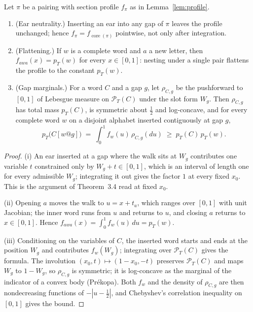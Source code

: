\begin{lemma}\label{lem:calculus}
Let $\pi$ be a pairing with section profile $f_\pi$ as in
Lemma~\ref{lem:profile}.
\begin{enumerate}
\item[(i)] (Ear neutrality.)  Inserting an ear into any gap of $\pi$
leaves the profile unchanged; hence $f_\pi=f_{\operatorname{core}(\pi)}$
pointwise, not only after integration.
\item[(ii)] (Flattening.)  If $w$ is a complete word and $a$ a new letter,
then $f_{awa}(x)=p_T(w)$ for every $x\in[0,1]$: nesting under a single
pair flattens the profile to the constant $p_T(w)$.
\item[(iii)] (Gap marginals.)  For a word $C$ and a gap $g$, let
$\rho_{C,g}$ be the pushforward to $[0,1]$ of Lebesgue measure on
$\mathcal P_T(C)$ under the slot form $W_g$.  Then $\rho_{C,g}$ has total
mass $p_T(C)$, is symmetric about $\tfrac12$ and log-concave, and for
every complete word $w$ on a disjoint alphabet inserted contiguously at
gap $g$,
\[
p_T\bigl(C[w@g]\bigr)\;=\;\int_0^1 f_w(u)\,\rho_{C,g}(du)\;\ge\;p_T(C)\,p_T(w).
\]
\end{enumerate}
\end{lemma}

\begin{proof}
(i) An ear inserted at a gap where the walk sits at $W_g$ contributes one
variable $t$ constrained only by $W_g+t\in[0,1]$, which is an interval of
length one for every admissible $W_g$; integrating it out gives the
factor $1$ at every fixed $x_0$.  This is the argument of Theorem~3.4
read at fixed $x_0$.

(ii) Opening $a$ moves the walk to $u=x+t_a$, which ranges over $[0,1]$
with unit Jacobian; the inner word runs from $u$ and returns to $u$, and
closing $a$ returns to $x\in[0,1]$.  Hence
$f_{awa}(x)=\int_0^1 f_w(u)\,du=p_T(w)$.

(iii) Conditioning on the variables of $C$, the inserted word starts and
ends at the position $W_g$ and contributes $f_w(W_g)$; integrating over
$\mathcal P_T(C)$ gives the formula.  The involution
$(x_0,t)\mapsto(1-x_0,-t)$ preserves $\mathcal P_T(C)$ and maps $W_g$ to
$1-W_g$, so $\rho_{C,g}$ is symmetric; it is log-concave as the marginal
of the indicator of a convex body (Pr\'ekopa).  Both $f_w$ and the
density of $\rho_{C,g}$ are then nondecreasing functions of
$-|u-\tfrac12|$, and Chebyshev's correlation inequality on $[0,1]$ gives
the bound.
\end{proof}

